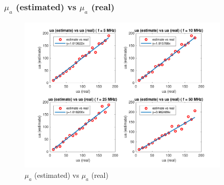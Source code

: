 \documentclass{article}
\begin{document}
\subsubsection{$\mu_a$ (estimated) vs $\mu_a$ (real)}
\begin{figure}[H]
    \centering
    \includegraphics[width=0.9\textwidth]{src/p1f-2.pdf}
    \caption{$\mu_a$ (estimated) vs $\mu_a$ (real)}
    \label{fig:p1f-2}
\end{figure}
\end{document}

